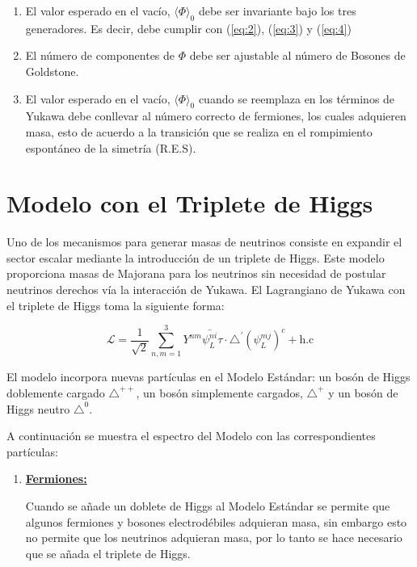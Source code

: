 \documentclass[12pt]{article}
\begin{document}
\begin{enumerate}
\begin{enumerate}
\item El valor esperado en el vacío,  \(\langle \Phi \rangle_0  \) debe ser invariante bajo los tres generadores. Es decir, debe cumplir con  (\ref{eq:2}), (\ref{eq:3}) y (\ref{eq:4})

\item El número de componentes de \(\Phi  \) debe ser ajustable al número de Bosones de Goldstone.

\item El valor esperado en el vacío,  \(\langle \Phi \rangle_0  \)  cuando se reemplaza en los términos de Yukawa debe conllevar al número correcto de fermiones, los cuales adquieren masa, esto de acuerdo a la transición que se realiza en el rompimiento espontáneo de la simetría (R.E.S). 
\end{enumerate}

\section{Modelo con el Triplete de Higgs}

Uno de los mecanismos para generar masas de neutrinos consiste en expandir el sector escalar mediante la introducción de un triplete de Higgs. Este modelo proporciona masas de Majorana para los neutrinos sin necesidad de postular neutrinos derechos vía la interacción de Yukawa. El Lagrangiano de Yukawa con el triplete de Higgs toma la siguiente forma:

\begin{equation}
    \mathcal{L}= \frac{1}{\sqrt{2}} \sum_{n,m=1}^3 Y^{nm} \bar{\psi_L^{ni}}\tau \cdot \triangle^{'} ({\psi_L^{mj}})^{c} + \text{h.c} 
    \label{eq:7}
\end{equation} 

El modelo incorpora nuevas partículas en el Modelo Estándar: un bosón de Higgs doblemente cargado \(\triangle^{++} \), un bosón simplemente cargados, \(\triangle^{+} \) y un bosón de Higgs neutro \(\triangle^{0} \). 

A continuación se muestra el espectro del Modelo con las correspondientes partículas: 


\begin{enumerate}
\item \underline{ \textbf{Fermiones:}}

Cuando se añade un doblete de Higgs al Modelo Estándar se permite que algunos fermiones y bosones electrodébiles adquieran masa, sin embargo esto no permite que los neutrinos adquieran masa, por lo tanto se hace necesario que se añada el triplete de Higgs. \\ 


\end{enumerate}
\end{enumerate}
\end{document}

